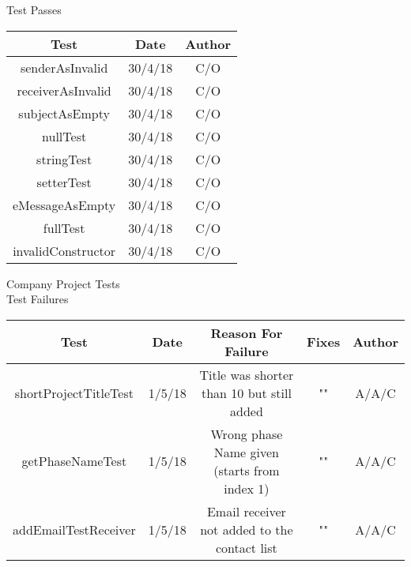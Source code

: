 \documentclass{article}
\begin{document}
\begin{center}
    \vspace{100mm}
    \huge Test Passes \\
    \vspace{5mm}
    \small
    \begin{tabular}{|c|c|c|}
        \hline
        Test & Date & Author \\
        \hline
        senderAsInvalid & 30/4/18 & C/O \\
        \hline
        receiverAsInvalid & 30/4/18 & C/O \\
        \hline
        subjectAsEmpty & 30/4/18 & C/O \\
        \hline
        nullTest & 30/4/18 & C/O \\
        \hline
        stringTest & 30/4/18 & C/O \\
        \hline
        setterTest & 30/4/18 & C/O \\
        \hline
        eMessageAsEmpty & 30/4/18 & C/O \\
        \hline
        fullTest & 30/4/18 & C/O \\
        \hline
        invalidConstructor & 30/4/18 & C/O \\
        \hline
    \end{tabular}

    \vspace{20mm}
    \huge Company Project Tests\\
    \huge Test Failures \\
    \vspace{5mm}
    \small
    \begin{tabular}{|c|c|c|c|c|}
        \hline
        Test & Date & Reason For Failure & Fixes & Author\\
        \hline
        shortProjectTitleTest & 1/5/18 & Title was shorter than 10 but still added & "" & A/A/C \\
        \hline
        getPhaseNameTest & 1/5/18 & Wrong phase Name given (starts from index 1) & "" & A/A/C \\
        \hline
        addEmailTestReceiver & 1/5/18 & Email receiver not added to the contact list & "" & A/A/C \\
        \hline
    \end{tabular}



\end{center}
\end{document}
